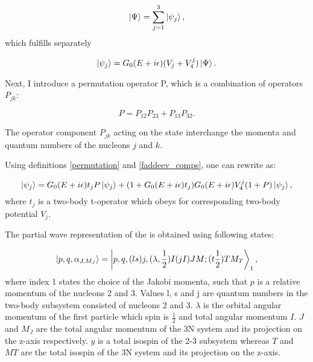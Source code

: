     \begin{equation}
        \ket{\Psi} = \sum_{j=1}^3 \ket{\psi_j},
        \label{faddeev_comps}
    \end{equation}
    which fulfills separately

    \begin{equation}
        \ket{\psi_j} = G_0(E+i\epsilon)(V_j + V_4^j) \ket{\Psi}.
        \label{psi3_component}
    \end{equation}

    Next, I introduce a permutation operator P, which is a combination
    of operators $P_{jk}$:
    
    \begin{equation}
        P = P_{12}P_{23} + P_{13}P_{32}.
        \label{permutation}
    \end{equation}

    The operator component $P_{jk}$ acting on the state interchange the momenta and  
    quantum numbers of the nucleons $j$ and $k$.

    Using definitions \ref{permutation} and \ref{faddeev_comps},
    one can rewrite  as:

    \begin{equation}
        \ket{\psi_j} = G_0(E+i\epsilon)t_j P \ket{\psi_j} + 
        (1 + G_0(E+i\epsilon)t_j)G_0(E+i\epsilon)V_4^j(1+P)\ket{\psi_j},
        \label{fadeed_lse}
    \end{equation}
    where $t_j$ is a two-body t-operator which obeys  for corresponding 
    two-body potential $V_j$.

The partial wave representation of the  is obtained using
following states:

\begin{equation}
    \ket{p,q,\alpha_{J,M_J}} = \ket{p,q,(ls)j, (\lambda, \frac{1}{2})I(jI)JM;(t\frac{1}{2})TM_T}_1,
    \label{3N_PW}
\end{equation}
where index 1 states the choice of the Jakobi momenta, such that $p$ is a relative momentum of the nucleons 2 and 3.
Values l, s and j are quantum numbers in the two-body subsystem consisted of nucleons 2 and 3. $\lambda$ is the 
orbital angular momentum of the first particle which spin is $\frac{1}{2}$ and total angular momentum $I$.
$J$ and $M_J$ are the total angular momentum of the 3N system and its projection on the z-axis respectively.
$y$ is a total isospin of the 2-3 subsystem whereas $T$ and $MT$ are the total isospin of the 3N system and its projection on the z-axis.  

